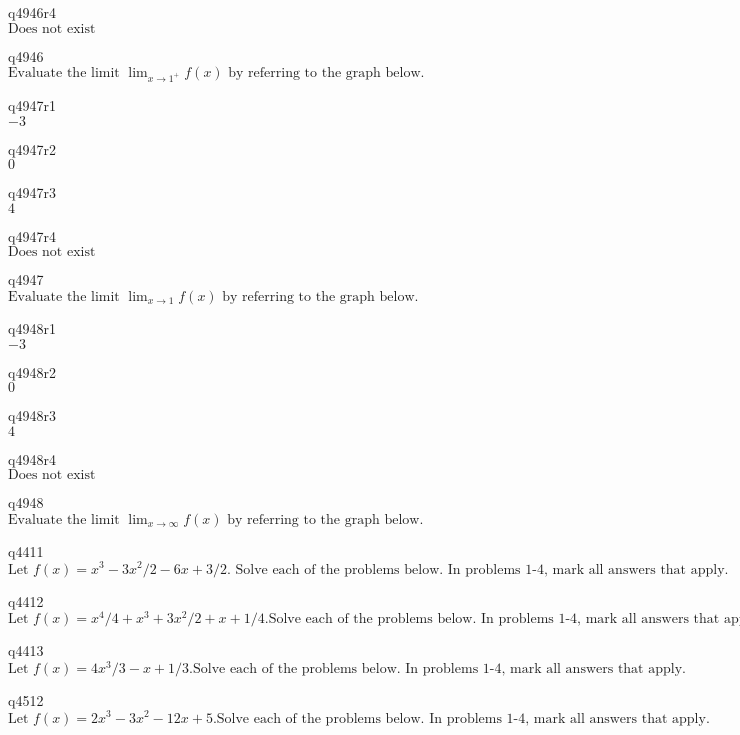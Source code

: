 q4946r4\\
\(\displaystyle \text{Does not exist} \)

q4946\\
\(\displaystyle \text{Evaluate the limit } \lim_{x \rightarrow 1^+} f(x) \text{ by referring to the graph below.} \)

q4947r1\\
\(\displaystyle -3 \)

q4947r2\\
\(\displaystyle 0 \)

q4947r3\\
\(\displaystyle 4 \)

q4947r4\\
\(\displaystyle \text{Does not exist} \)

q4947\\
\(\displaystyle \text{Evaluate the limit } \lim_{x \rightarrow 1} f(x) \text{ by referring to the graph below.} \)

q4948r1\\
\(\displaystyle -3 \)

q4948r2\\
\(\displaystyle 0 \)

q4948r3\\
\(\displaystyle 4 \)

q4948r4\\
\(\displaystyle \text{Does not exist} \)

q4948\\
\(\displaystyle \text{Evaluate the limit } \lim_{x \rightarrow \infty} f(x) \text{ by referring to the graph below.} \)

q4411\\
\(\displaystyle \text{Let } f(x) = x^3 - 3x^2/2 - 6x + 3/2. \text{ Solve each of the problems below. In problems 1-4, mark all answers that apply.} \)

q4412\\
\(\displaystyle \text{Let } f(x) = x^4 / 4 + x^3 + 3x^2 / 2 + x + 1/4. \text{Solve each of the problems below. In problems 1-4, mark all answers that apply.} \)

q4413\\
\(\displaystyle \text{Let } f(x) = 4x^3 / 3 - x + 1/3. \text{Solve each of the problems below. In problems 1-4, mark all answers that apply.} \)

q4512\\
\(\displaystyle \text{Let } f(x) = 2x^3 - 3x^2 - 12x + 5. \text{Solve each of the problems below. In problems 1-4, mark all answers that apply.} \)

